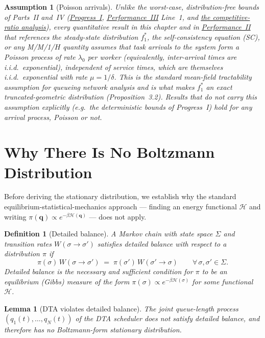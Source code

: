 \documentclass[11pt,a4paper]{article}
\newtheorem{lemma}[theorem]{Lemma}
\newtheorem{definition}{Definition}[section]
\newtheorem{assumption}{Assumption}[section]
\begin{document}
\begin{assumption}[Poisson arrivals]
\label{ass:poisson}
Unlike the worst-case, distribution-free bounds of Parts~II and~IV
(\hyperref[chap:bounded_wait]{Progress~I}, \hyperref[chap:makespan]{Performance~III}
Line~1, and \hyperref[chap:competitive_ratio]{the competitive-ratio analysis}),
every quantitative result in this chapter and in
\hyperref[chap:kinetic_theory]{Performance~II} that references the
steady-state distribution $f_1^*$, the self-consistency equation (SC),
or any M/M/1/$H$ quantity assumes that task arrivals to the system
form a Poisson process of rate $\lambda_0$ per worker (equivalently,
inter-arrival times are i.i.d.\ exponential), independent of service
times, which are themselves i.i.d.\ exponential with rate $\mu = 1/\delta$.
This is the standard mean-field tractability assumption for queueing
network analysis and is what makes $f_1^*$ an exact truncated-geometric
distribution (Proposition~3.2). Results that do \emph{not} carry this
assumption explicitly (e.g.\ the deterministic bounds of Progress~I) hold
for \emph{any} arrival process, Poisson or not.
\end{assumption}

\section{Why There Is No Boltzmann Distribution}

Before deriving the stationary distribution, we establish why the
standard equilibrium-statistical-mechanics approach --- finding an
energy functional $\mathcal{H}$ and writing $\pi(\bm{q}) \propto
e^{-\beta\mathcal{H}(\bm{q})}$ --- does not apply.

\begin{definition}[Detailed balance]
\label{def:db}
A Markov chain with state space $\Sigma$ and transition rates
$W(\sigma \to \sigma')$ satisfies \emph{detailed balance} with
respect to a distribution $\pi$ if
\[
  \pi(\sigma)\,W(\sigma \to \sigma')
  \;=\;
  \pi(\sigma')\,W(\sigma' \to \sigma)
  \qquad \forall\,\sigma, \sigma' \in \Sigma.
\]
Detailed balance is the necessary and sufficient condition for
$\pi$ to be an equilibrium (Gibbs) measure of the form
$\pi(\sigma) \propto e^{-\beta\mathcal{H}(\sigma)}$ for some
functional $\mathcal{H}$.
\end{definition}

\begin{lemma}[DTA violates detailed balance]
\label{lem:no-db}
The joint queue-length process $(q_1(t), \ldots, q_N(t))$ of
the DTA scheduler does not satisfy detailed balance, and
therefore has no Boltzmann-form stationary distribution.
\end{lemma}
\end{document}
